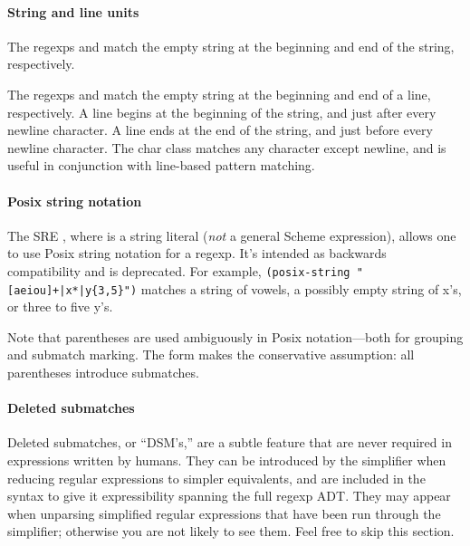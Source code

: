 \paragraph{String and line units}

The regexps  and  match the empty string at the
beginning and end of the string, respectively.

The regexps  and  match the empty string at the beginning and
end of a line, respectively. A line begins at the beginning of the string, and
just after every newline character. A line ends at the end of the string, and
just before every newline character. The char class  matches any
character except newline, and is useful in conjunction with line-based pattern
matching.



\paragraph{Posix string notation}

The SRE , 
where  is a string literal
(\emph{not} a general Scheme expression), allows one to use Posix string
notation for a regexp. It's intended as backwards compatibility and
is deprecated. 
For example, \verb!(posix-string "[aeiou]+|x*|y{3,5}")! matches 
a string of vowels, a possibly empty string of x's, or three to five
y's.

Note that parentheses are used ambiguously in Posix notation---both for
grouping and submatch marking. 
The  form makes the conservative assumption: 
all parentheses introduce submatches.

\paragraph{Deleted submatches}

Deleted submatches, or ``DSM's,'' 
are a subtle feature that are never required in expressions written
by humans. They can be introduced by the simplifier when reducing
regular expressions to simpler equivalents, and are included in the
syntax to give it expressibility spanning the full regexp ADT. They
may appear when unparsing simplified regular expressions that have
been run through the simplifier; otherwise you are not likely to see them.
Feel free to skip this section.

